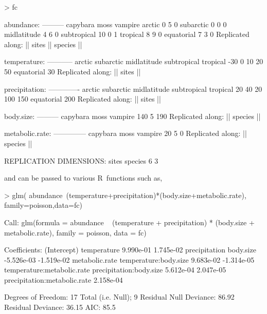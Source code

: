 \documentclass{article}
\newcommand{\R}{{\sf R}}
\numberwithin{exercise}{section}
\begin{document}
\begin{Schunk}
\begin{Sinput}
> fc
\end{Sinput}
\begin{Soutput}
abundance:
---------
            capybara moss vampire
arctic             0    5       0
subarctic          0    0       0
midlatitude        4    6       0
subtropical       10    0       1
tropical           8    9       0
equatorial         7    3       0
Replicated along:  || sites || species || 


temperature:
-----------
     arctic   subarctic midlatitude subtropical    tropical 
        -30           0          10          20          50 
 equatorial 
         30 
Replicated along:  || sites || 


precipitation:
-------------
     arctic   subarctic midlatitude subtropical    tropical 
         20          40          20         100         150 
 equatorial 
        200 
Replicated along:  || sites || 


body.size:
---------
capybara     moss  vampire 
     140        5      190 
Replicated along:  || species || 


metabolic.rate:
--------------
capybara     moss  vampire 
      20        5        0 
Replicated along:  || species || 


REPLICATION DIMENSIONS: 
  sites species 
      6       3 
\end{Soutput}
\end{Schunk}
and can be passed to various \R\ functions such as,
\begin{Schunk}
\begin{Sinput}
> glm(
   abundance~(temperature+precipitation)*(body.size+metabolic.rate),
   family=poisson,data=fc)
\end{Sinput}
\begin{Soutput}
Call:  glm(formula = abundance ~ (temperature + precipitation) * (body.size + 
    metabolic.rate), family = poisson, data = fc)

Coefficients:
                 (Intercept)                   temperature  
                   9.990e-01                     1.745e-02  
               precipitation                     body.size  
                  -5.526e-03                    -1.519e-02  
              metabolic.rate         temperature:body.size  
                   9.683e-02                    -1.314e-05  
  temperature:metabolic.rate       precipitation:body.size  
                   5.612e-04                     2.047e-05  
precipitation:metabolic.rate  
                   2.158e-04  

Degrees of Freedom: 17 Total (i.e. Null);  9 Residual
Null Deviance:	    86.92 
Residual Deviance: 36.15 	AIC: 85.5 
\end{Soutput}
\end{Schunk}
\end{document}
